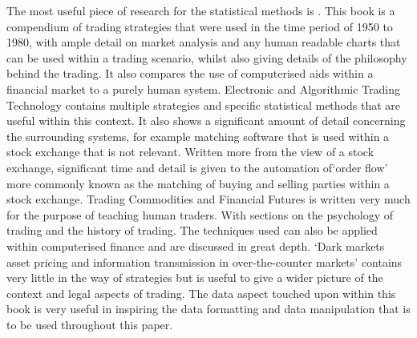 \documentclass[conference]{IEEEtran}
\begin{document}
The most useful piece of research for the statistical methods is \cite{Murphy1999}. This book is a compendium of trading strategies that were used in the time period of 1950 to 1980, with ample detail on market analysis and any human readable charts that can be used within a trading scenario, whilst also giving details of the philosophy behind the trading. It also compares the use of computerised aids within a financial market to a purely human system. Electronic and Algorithmic Trading Technology \cite{Kim2007} contains multiple strategies and specific statistical methods that are useful within this context. It also shows a significant amount of detail concerning the surrounding systems, for example matching software that is used within a stock exchange that is not relevant. Written more from the view of a stock exchange, significant time and detail is given to the automation of`order flow' more commonly known as the matching of buying and selling parties within a stock exchange. Trading Commodities and Financial Futures \cite{Kleinman2005} is written very much for the purpose of teaching human traders. With sections on the psychology of trading and the history of trading. The techniques used can also be applied within computerised finance and are discussed in great depth. `Dark markets asset pricing and information transmission in over-the-counter markets' \cite{Duffie2012} contains very little in the way of strategies but is useful to give a wider picture of the context and legal aspects of trading. The data aspect touched upon within this book is very useful in inspiring the data formatting and data manipulation that is to be used throughout this paper.
\end{document}
